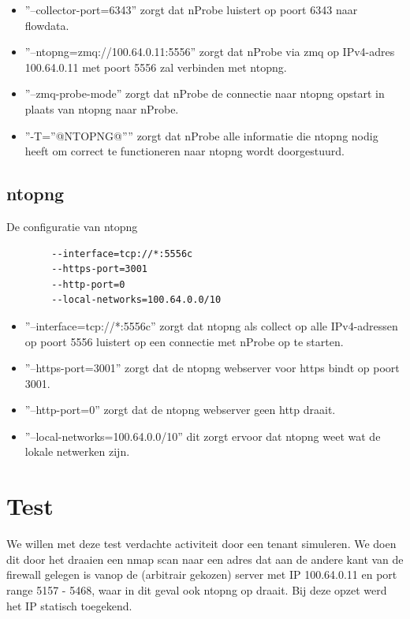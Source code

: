 \begin{itemize}
    \item ''--collector-port=6343'' zorgt dat nProbe luistert op poort 6343 naar flowdata.
    \item ''--ntopng=zmq://100.64.0.11:5556'' zorgt dat nProbe via zmq op IPv4-adres 100.64.0.11 met poort 5556 zal verbinden met ntopng.
    \item ''--zmq-probe-mode'' zorgt dat nProbe de connectie naar ntopng opstart in plaats van ntopng naar nProbe.
    \item ''-T=”@NTOPNG@”'' zorgt dat nProbe alle informatie die ntopng nodig heeft om correct te functioneren naar ntopng wordt doorgestuurd.
\end{itemize}

\subsection{ntopng}
\begin{listing}[H]
    \caption[ntopng configuration]{De configuratie van ntopng}
    \label{code:ntopngConf}

    \begin{verbatim}
        --interface=tcp://*:5556c
        --https-port=3001
        --http-port=0
        --local-networks=100.64.0.0/10
    \end{verbatim}
\end{listing}

\begin{itemize}
    \item ''--interface=tcp://*:5556c'' zorgt dat ntopng als collect op alle IPv4-adressen op poort 5556 luistert op een connectie met nProbe op te starten.
    \item ''--https-port=3001'' zorgt dat de ntopng webserver voor https bindt op poort 3001.
    \item ''--http-port=0'' zorgt dat de ntopng webserver geen http draait.
    \item ''--local-networks=100.64.0.0/10'' dit zorgt ervoor dat ntopng weet wat de lokale netwerken zijn.
\end{itemize}

\section{Test}
We willen met deze test verdachte activiteit door een tenant simuleren. We doen dit door het draaien een nmap scan naar een adres dat aan de andere kant van de firewall gelegen is vanop de (arbitrair gekozen) server met IP 100.64.0.11 en port range 5157 - 5468, waar in dit geval ook ntopng op draait. Bij deze opzet werd het IP statisch toegekend.

